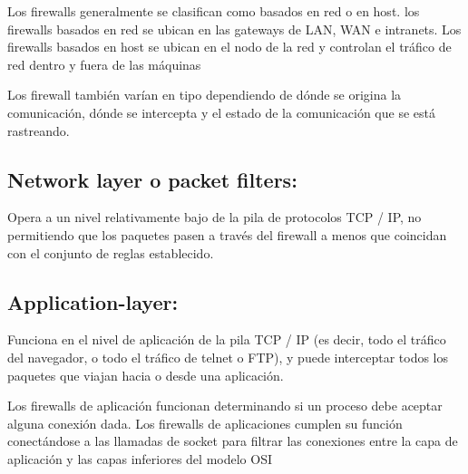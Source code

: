\documentclass{article}
\begin{document}
\vspace{\baselineskip}
\begin{flushleft}
	Los firewalls generalmente se clasifican como basados en red o en host. los firewalls basados en red se ubican en las gateways de LAN, WAN e intranets. Los firewalls basados en host se ubican en el nodo de la red y controlan el tráfico de red dentro y fuera de las máquinas
\end{flushleft}\par


\vspace{\baselineskip}

\vspace{\baselineskip}
\begin{flushleft}
	Los firewall también varían en tipo dependiendo de dónde se origina la comunicación, dónde se intercepta y el estado de la comunicación que se está rastreando.
\end{flushleft}\par


\vspace{\baselineskip}

\vspace{\baselineskip}
\subsection*{Network layer o packet filters:}
Opera a un nivel relativamente bajo de la pila de protocolos TCP / IP, no permitiendo que los paquetes pasen a través del firewall a menos que coincidan con el conjunto de reglas establecido.\par


\vspace{\baselineskip}
\subsection*{Application-layer:}

\vspace{\baselineskip}
Funciona en el nivel de aplicación de la pila TCP / IP (es decir, todo el tráfico del navegador, o todo el tráfico de telnet o FTP), y puede interceptar todos los paquetes que viajan hacia o desde una aplicación.\par


\vspace{\baselineskip}
Los firewalls de aplicación funcionan determinando si un proceso debe aceptar alguna conexión dada. Los firewalls de aplicaciones cumplen su función conectándose a las llamadas de socket para filtrar las conexiones entre la capa de aplicación y las capas inferiores del modelo OSI\par
\end{document}
